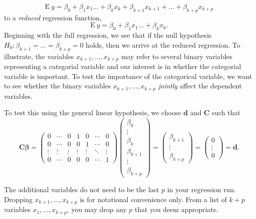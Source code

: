 \begin{equation*}
\mathrm{E~}y=\beta_0+\beta_1x_1...+\beta_kx_k+\beta
_{k+1}x_{k+1}+...+\beta_{k+p}x_{k+p}
\end{equation*}%
to a \emph{reduced} regression function,%
\begin{equation*}
\mathrm{E~}y=\beta_0+\beta_1x_1...+\beta_kx_k.
\end{equation*}%
Beginning with the full regression, we see that if the null
hypothesis $H_0:\beta_{k+1}=...=\beta_{k+p}=0$ holds, then we arrive
at the reduced regression. To illustrate, the variables $x_{k+1},
\ldots, x_{k+p}$ may refer to several binary variables representing
a categorial variable and our interest is in whether the categorial
variable is important. To test the importance of the categorical
variable, we want to see whether the binary variables $x_{k+1},
\ldots, x_{k+p}$ \emph{jointly} affect the dependent variables.

To test this using the general linear hypothesis, we choose
$\mathbf{d}$ and
$\mathbf{C}$ such that%
\begin{equation*}
\mathbf{C\boldsymbol \beta =}\left(
\begin{array}{ccccccc}
0 & \cdots  & 0 & 1 & 0 & \cdots  & 0 \\
0 & \cdots  & 0 & 0 & 1 & \cdots  & 0 \\
\vdots  & \vdots  & \vdots  & \vdots  & \vdots  & \ddots  & \vdots  \\
0 & \cdots  & 0 & 0 & 0 & \cdots  & 1%
\end{array}%
\right) \left(
\begin{array}{c}
\beta_0 \\
\vdots  \\
\beta_k \\
\beta_{k+1} \\
\vdots  \\
\beta_{k+p}%
\end{array}%
\right) =\left(
\begin{array}{c}
\beta_{k+1} \\
\vdots  \\
\beta_{k+p}%
\end{array}%
\right) =\left(
\begin{array}{c}
0 \\
\vdots  \\
0
\end{array}%
\right) =\mathbf{d}.
\end{equation*}

The additional variables do not need to be the last $p$ in your
regression run. Dropping $x_{k+1},...,x_{k+p}$ is for notational
convenience only. From a list of $k+p$ variables $x_1,...,x_{k+p}$,
you may drop any $p$ that you deem appropriate.


